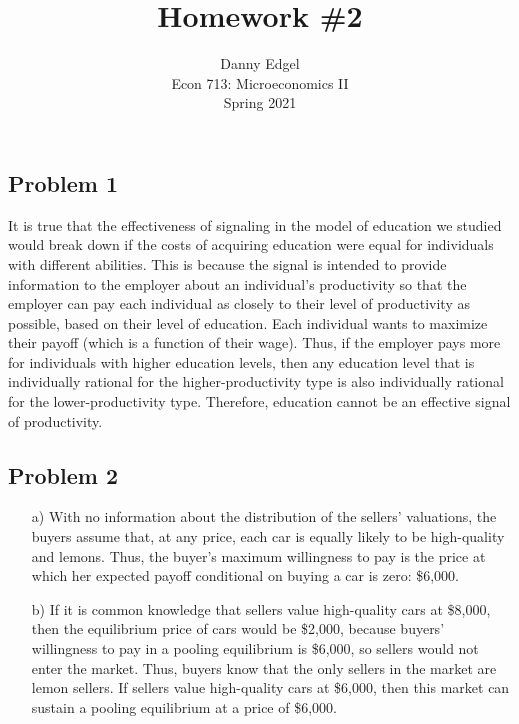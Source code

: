 \documentclass{article}
\begin{document}
\title{	Homework \#2 }
\author{ 	Danny Edgel 					\\ 
			Econ 713: Microeconomics II		\\
			Spring 2021						\\
		}
\maketitle\thispagestyle{empty}



\subsection*{Problem 1}

It is true that the effectiveness of signaling in the model of education we studied would break down if the costs of acquiring education were equal for individuals with different abilities. This is because the signal is intended to provide information to the employer about an individual's productivity so that the employer can pay each individual as closely to their level of productivity as possible, based on their level of education. Each individual wants to maximize their payoff (which is a function of their wage). Thus, if the employer pays more for individuals with higher education levels, then any education level that is individually rational for the higher-productivity type is also individually rational for the lower-productivity type. Therefore, education cannot be an effective signal of productivity.


\subsection*{Problem 2}

\begin{itemize}
	\item[a)] With no information about the distribution of the sellers' valuations, the buyers assume that, at any price, each car is equally likely to be high-quality and lemons. Thus, the buyer's maximum willingness to pay is the price at which her expected payoff conditional on buying a car is zero: \$6,000.
	
	
	\item[b)] If it is common knowledge that sellers value high-quality cars at \$8,000, then the equilibrium price of cars would be \$2,000, because buyers' willingness to pay in a pooling equilibrium is \$6,000, so sellers would not enter the market. Thus, buyers know that the only sellers in the market are lemon sellers. If sellers value high-quality cars at \$6,000, then this market can sustain a pooling equilibrium at a price of \$6,000.
		
\end{itemize}
\end{document}
